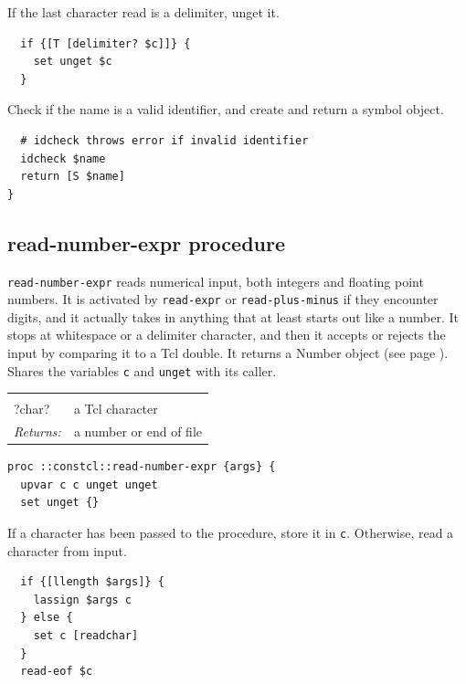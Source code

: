 \documentclass[twoside]{report}
\begin{document}
If the last character read is a delimiter, unget it.

\begin{lstlisting}
  if {[T [delimiter? $c]]} {
    set unget $c
  }
\end{lstlisting}

Check if the name is a valid identifier, and create and return a symbol object.

\begin{lstlisting}
  # idcheck throws error if invalid identifier
  idcheck $name
  return [S $name]
}
\end{lstlisting}

\subsection{read-number-expr procedure}
\label{readnumberexpr-procedure}

\texttt{read-number-expr} reads numerical input, both integers and floating point numbers. It is activated by \texttt{read-expr} or \texttt{read-plus-minus} if they encounter digits, and it actually takes in anything that at least starts out like a number. It stops at whitespace or a delimiter character, and then it accepts or rejects the input by comparing it to a Tcl double. It returns a Number object (see page \pageref{numbers}). Shares the variables \texttt{c} and \texttt{unget} with its caller.

\noindent\begin{tabular}{ |p{1.9cm} p{8cm}| }
\hline
\rowcolor[HTML]{CCCCCC} \multicolumn{2}{|l|}{\bf read-number-expr (internal)} \\
?char? & a Tcl character \\
\textit{Returns:} & a number or end of file \\
\hline
\end{tabular}

\begin{lstlisting}
proc ::constcl::read-number-expr {args} {
  upvar c c unget unget
  set unget {}
\end{lstlisting}

If a character has been passed to the procedure, store it in \texttt{c}. Otherwise, read a character from input.

\begin{lstlisting}
  if {[llength $args]} {
    lassign $args c
  } else {
    set c [readchar]
  }
  read-eof $c
\end{lstlisting}
\end{document}
